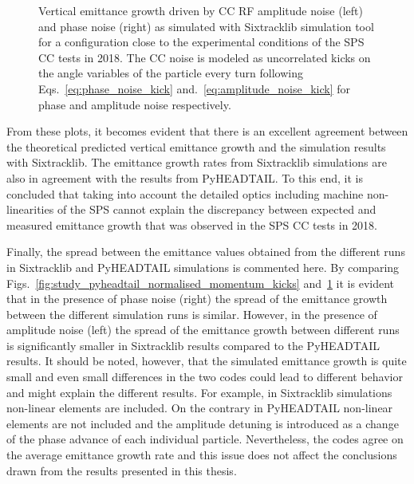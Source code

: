 \begin{figure}[htp]
\begin{subfigure}{.45\textwidth}
    \end{subfigure}
    \caption{Vertical emittance growth driven by CC RF amplitude noise (left) and phase noise (right) as simulated with Sixtracklib simulation tool for a configuration close to the experimental conditions of the SPS CC tests in 2018. The CC noise is modeled as uncorrelated kicks on the angle variables of the particle every turn following Eqs.~\eqref{eq:phase_noise_kick} and.~\eqref{eq:amplitude_noise_kick} for phase and amplitude noise respectively.}
    \label{fig:study_1_sixtracklib_normalised_momentum_kicks}
\end{figure}

From these plots, it becomes evident that there is an excellent agreement between the theoretical predicted vertical emittance growth and the simulation results with Sixtracklib. The emittance growth rates from Sixtracklib simulations are also in agreement with the results from PyHEADTAIL. To this end, it is concluded that taking into account the detailed optics including machine non-linearities of the SPS cannot explain the discrepancy between expected and measured emittance growth that was observed in the SPS CC tests in 2018.

Finally, the spread between the emittance values obtained from the different runs in Sixtracklib and PyHEADTAIL simulations is commented here. By comparing Figs.~\ref{fig:study_pyheadtail_normalised_momentum_kicks} and~\ref{fig:study_1_sixtracklib_normalised_momentum_kicks} it is evident that in the presence of phase noise (right) the spread of the emittance growth between the different simulation runs is similar. However, in the presence of amplitude noise (left) the spread of the emittance growth between different runs is significantly smaller in Sixtracklib results compared to the PyHEADTAIL results. It should be noted, however, that the simulated emittance growth is quite small and even small differences in the two codes could lead to different behavior and might explain the different results. For example, in Sixtracklib simulations non-linear elements are included. On the contrary in PyHEADTAIL non-linear elements are not included and the amplitude detuning is introduced as a change of the phase advance of each individual particle. Nevertheless, the codes agree on the average emittance growth rate and this issue does not affect the conclusions drawn from the results presented in this thesis. 
 

